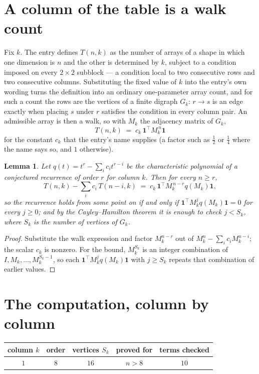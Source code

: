 \documentclass[11pt,a4paper]{article}
\theoremstyle{plain}
\newtheorem{lemma}[theorem]{Lemma}
\theoremstyle{definition}
\begin{document}
\section{A column of the table is a walk count}

Fix $k$. The entry defines $T(n,k)$ as the number of arrays of a shape in which one dimension
is $n$ and the other is determined by $k$, subject to a condition imposed on every
$2\times2$ subblock --- a condition local to two consecutive rows and two consecutive columns.
Substituting the fixed value of $k$ into the entry's own wording turns the definition into an
ordinary one-parameter array count, and for such a count the rows are the vertices of a finite
digraph $G_k$: $r\to s$ is an edge exactly when placing $s$ under $r$ satisfies the condition
in every column pair. An admissible array is then a walk, so with $M_k$ the adjacency matrix
of $G_k$,
\[
T(n,k)\;=\;c_k\,\mathbf{1}^{\!\top}M_k^{\,n}\mathbf{1}
\]
for the constant $c_k$ that the entry's name supplies (a factor such as $\tfrac12$ or
$\tfrac14$ where the name says so, and $1$ otherwise).

\begin{lemma}\label{lem:crit}
Let $q(t)=t^{r}-\sum_i c_it^{r-i}$ be the characteristic polynomial of a conjectured
recurrence of order $r$ for column $k$. Then for every $n\ge r$,
\[
T(n,k)-\sum_i c_i\,T(n-i,k)\;=\;c_k\,\mathbf{1}^{\!\top}M_k^{\,n-r}q(M_k)\mathbf{1},
\]
so the recurrence holds from some point on if and only if
$\mathbf{1}^{\!\top}M_k^{j}q(M_k)\mathbf{1}=0$ for every $j\ge0$; and by the
Cayley--Hamilton theorem it is enough to check $j<S_k$, where $S_k$ is the number of vertices
of $G_k$.
\end{lemma}

\begin{proof}
Substitute the walk expression and factor $M_k^{n-r}$ out of $M_k^{n}-\sum_ic_iM_k^{n-i}$;
the scalar $c_k$ is nonzero. For the bound, $M_k^{S_k}$ is an integer combination of
$I,M_k,\dots,M_k^{S_k-1}$, so each $\mathbf{1}^{\!\top}M_k^{j}q(M_k)\mathbf{1}$ with
$j\ge S_k$ repeats that combination of earlier values.
\end{proof}

\section{The computation, column by column}

\begin{center}
\begin{tabular}{ccccc}
column $k$ & order & vertices $S_k$ & proved for & terms checked \\ \hline
$1$ & $8$ & $16$ & $n>8$ & $10$ \\
\end{tabular}
\end{center}
\end{document}

